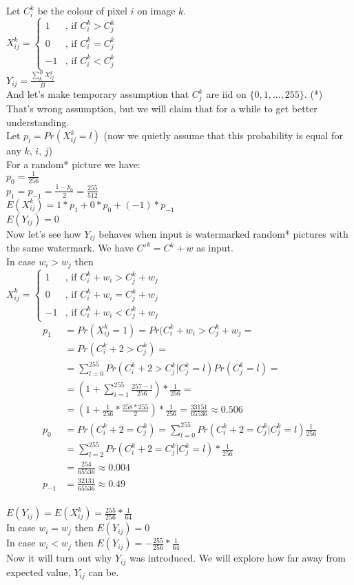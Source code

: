 \documentclass[varwidth]{standalone}
\begin{document}
Let $C^k_i$ be the colour of pixel $i$ on image $k$.\\
$X^k_{ij} =
\left\{
\begin{matrix}
1 & \text{, if } C^k_i > C^k_j\\
0 & \text{, if } C^k_i = C^k_j\\
-1 & \text{, if } C^k_i < C^k_j
\end{matrix}\right.$\\
$Y_{ij} = \frac{\sum^B_k X^k_{ij}}{B}$\\
And let's make temporary assumption that $C^k_j$ are iid on $\{0, 1, ..., 255\}$. (*)\\
That's wrong assumption, but we will claim that for a while to get better understanding.\\
Let $p_l = Pr(X^k_{ij} = l)$
(now we quietly assume that this probability is equal for any $k$, $i$, $j$)\\
For a random* picture we have:\\
$p_0 = \frac{1}{256}$\\
$p_1 = p_{-1} = \frac{1-p_0}{2} = \frac{255}{512}$\\
$E(X^k_{ij}) = 1*p_1 + 0*p_0 + (-1)*p_{-1}$\\
$E(Y_{ij}) = 0$\\
Now let's see how $Y_{ij}$ behaves when input is watermarked random* pictures with the same watermark. We have $C'^k = C^k + w$ as input.\\
In case $w_i > w_j$ then\\
$X^k_{ij} =
\left\{
\begin{matrix}
1 & \text{, if } C^k_i + w_i > C^k_j + w_j\\
0 & \text{, if } C^k_i + w_i = C^k_j + w_j\\
-1 & \text{, if } C^k_i + w_i < C^k_j + w_j
\end{matrix}\right.$\\
\begin{align*}
p_1 &= Pr(X^k_{ij} = 1) = Pr(C^k_i + w_i > C^k_j + w_j =\\
    &= Pr(C^k_i + 2 > C^k_j) =\\
    &= \sum_{l=0}^{255} Pr(C^k_i + 2 > C^k_j | C^k_j = l)Pr(C^k_j = l) =\\
    &= (1 + \sum_{i=1}^{255} \frac{257-i}{256})*\frac{1}{256} =\\
    &= (1 + \frac{1}{256}*\frac{258*255}{2})*\frac{1}{256}=\frac{33151}{65536}
        \approx 0.506\\
p_0 &= Pr(C^k_i + 2 = C^k_j) = \sum_{l=0}^{255} Pr(C^k_i + 2 = C^k_j | C^k_j = l)\frac{1}{256}\\
    &= \sum_{l=2}^{255} Pr(C^k_i + 2 = C^k_j | C^k_j = l)*\frac{1}{256}\\
    &= \frac{254}{65536} \approx 0.004\\
p_{-1} &= \frac{32131}{65536} \approx 0.49
\end{align*}\\
$E(Y_{ij}) = E(X^k_{ij}) = \frac{255}{256}*\frac{1}{64}$\\
In case $w_i = w_j$ then $E(Y_{ij}) = 0$\\
In case $w_i < w_j$ then $E(Y_{ij}) = -\frac{255}{256}*\frac{1}{64}$\\
Now it will turn out why $Y_{ij}$ was introduced. We will explore how far away
from expected value, $Y_{ij}$ can be.
\end{document}
